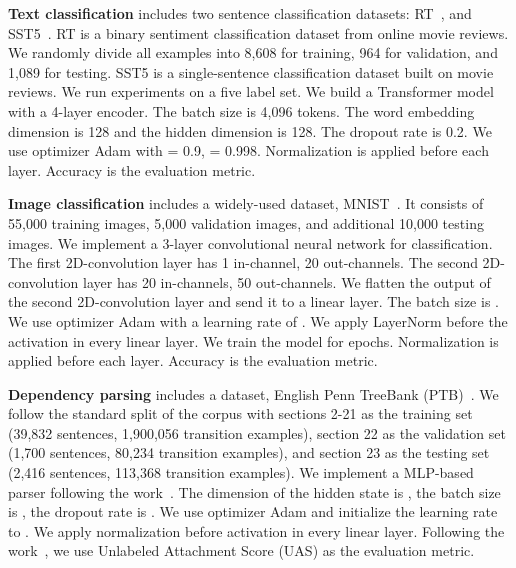 \documentclass{article}
\begin{document}
 \textbf{Text classification} includes two sentence classification datasets:  RT~\citep{PangLee}, and SST5~\citep{socher2013recursive}. RT is a binary  sentiment classification dataset from online movie reviews. We randomly divide all examples into 8,608 for training, 964 for validation, and 1,089 for testing.  SST5 is a single-sentence classification dataset built on movie reviews.  We run experiments on a five label set.   We build a Transformer model with a 4-layer encoder. The batch size is 4,096 tokens. The word embedding dimension is 128 and the hidden dimension is 128. The dropout rate is 0.2.   We use  optimizer Adam with  = 0.9,   = 0.998. Normalization is applied before each layer. Accuracy is the evaluation metric. 


 \textbf{Image classification} includes a widely-used dataset, MNIST~\citep{lecun1998gradient}. It consists of 55,000 training images, 5,000 validation images, and additional 10,000 testing images.  We implement a 3-layer convolutional neural network for classification. The first 2D-convolution layer has 1 in-channel, 20 out-channels. The second 2D-convolution layer has 20 in-channels, 50 out-channels. We flatten the output of the second 2D-convolution layer and send it to a linear layer. The batch size is  . We use  optimizer Adam with a learning rate of . We apply LayerNorm before the activation in every linear layer. We train the model for  epochs.  Normalization is applied before each layer. Accuracy is the evaluation metric.  
 
 
\textbf{Dependency parsing} includes a dataset, English Penn TreeBank (PTB)~\citep{DBLP:journals/coling/MarcusSM94}.  We follow the standard split of the corpus with sections 2-21 as the training set (39,832 sentences, 1,900,056 transition examples), section 22 as the validation set (1,700 sentences, 80,234 transition examples), and section 23 as the testing set (2,416 sentences, 113,368 transition examples). We implement a  MLP-based parser following the work~\citep{DBLP:conf/emnlp/ChenM14}.   The dimension of the hidden state is , the batch size is , the dropout rate is . We use optimizer Adam and initialize the learning rate to . We apply normalization before activation in every linear layer.  Following the work~\citep{DBLP:conf/emnlp/ChenM14}, we use  Unlabeled Attachment Score (UAS) as the evaluation metric. 





  
  
\end{document}
